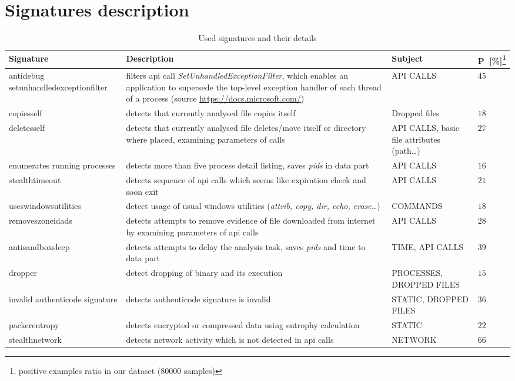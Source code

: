 \chapter{Signatures description} \label{app:signatures} \label{app:histogram} \label{app:frequecies}

\begin{table}[h]
  \centering
  \caption{Used signatures and their details}
  \begin{minipage}{\linewidth}
  \begin{tabular}{p{3.5cm}p{6cm}p{3cm}p{1.3cm}}
    \toprule
    \textbf{Signature} &
    \textbf{Description} &
    \textbf{Subject} &
    \textbf{P~[\%]\footnote[1]{positive examples ratio in our dataset ($80000$ samples)}}
    \\
    \midrule
    antidebug setunhandledexceptionfilter & filters api call \emph{SetUnhandledExceptionFilter}, which enables an application to supersede the top-level exception handler of each thread of a process  (source \url{https://docs.microsoft.com/})  & API CALLS & $45$ \\
    \midrule
    copiesself & detects that currently analysed file copies itself & Dropped files & $18$ \\
    \midrule
    deletesself & detects that currently analysed file deletes/move itself or directory where placed, examining parameters of calls & API CALLS, basic file attributes (path\dots) & $27$ \\
    \midrule
    enumerates running processes & detects more than five process detail listing, saves \emph{pids} in data part & API CALLS & $16$ \\
    \midrule
    stealthtimeout & detects sequence of api calls which seems like expiration check and soon exit & API CALLS & $21$ \\
    \midrule
    useswindowsutilities & detect usage of usual windows utilities (\emph{attrib, copy, dir, echo, erase\dots}) & COMMANDS & $18$ \\
    \midrule
    removeszoneidads & detects attempts to remove evidence of file downloaded from internet by examining parameters of api calls& API CALLS & $28$ \\
    \midrule[0.3pt]
    \midrule[0.3pt]
    antisandboxsleep & detects attempts to delay the analysis task, saves \emph{pids} and time to data part & TIME, API CALLS & $39$ \\
    \midrule
    dropper & detect dropping of binary and its execution & PROCESSES, DROPPED FILES & $15$ \\
    \midrule
    invalid authenticode signature & detects authenticode signature is invalid & STATIC, DROPPED FILES & $36$ \\
    \midrule
    packerentropy & detects encrypted or compressed data using entrophy calculation & STATIC & $22$ \\
    \midrule
    stealthnetwork & detects network activity which is not detected in api calls & NETWORK & $66$ \\
    \bottomrule
  \end{tabular}
  \end{minipage}
  \label{tab:signatures_detail}
\end{table}

